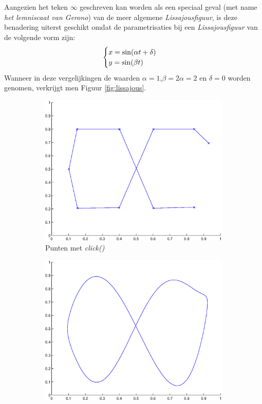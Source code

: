 \documentclass[a4paper]{article}
\begin{document}
Aangezien het teken $\infty$ geschreven kan worden als een speciaal geval (met name \textit{het lemniscaat van Gerono}) van de meer algemene \textit{Lissajousfiguur}, is deze benadering uiterst geschikt omdat de parametrisaties bij een \textit{Lissajousfiguur} van de volgende vorm zijn:
\begin{equation}
    \centering
        \begin{cases}
            x=\sin (\alpha t+\delta)\\
            y=\sin (\beta t)
        \end{cases}
\end{equation}
Wanneer in deze vergelijkingen de waarden $\alpha=1$,$\beta=2\alpha=2$ en $\delta=0$ worden genomen, verkrijgt men Figuur \ref{fig:lissajous}.
\begin{figure}
    \centering
    \begin{subfigure}[b]{0.4\textwidth}
        \centering
        \includegraphics[width=\textwidth]{infclick.eps}
        \caption{Punten met \textit{click()}}
        \label{fig:periotriga}
    \end{subfigure}
    \begin{subfigure}[b]{0.4\textwidth}
        \centering
        \includegraphics[width=\textwidth]{inftrig.eps}

\end{subfigure}
\end{figure}
\end{document}
